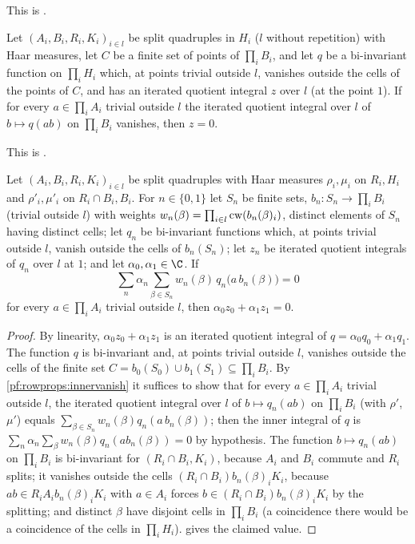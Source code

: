 This is .

\begin{lemma}\label{pf:rowprops:innervanish}
Let $(A_i,B_i,R_i,K_i)_{i\in l}$ be split quadruples in $H_i$ ($l$ without repetition) with Haar measures, let $C$ be a finite
set of points of $\prod_iB_i$, and let $q$ be a bi-invariant function on $\prod_iH_i$ which, at points trivial outside $l$,
vanishes outside the cells of the points of $C$, and has an iterated quotient integral $z$ over $l$ (at the point $1$).
If for every $a\in\prod_iA_i$ trivial outside $l$ the iterated quotient integral over $l$ of $b\mapsto q(ab)$ on
$\prod_iB_i$ vanishes, then $z=0$.
\end{lemma}

This is .

\begin{proposition}\label{pf:rowprops:cellvan}
Let $(A_i,B_i,R_i,K_i)_{i\in l}$ be split quadruples with Haar measures $\rho_i,\mu_i$ on $R_i,H_i$ and
$\rho'_i,\mu'_i$ on $R_i\cap B_i,B_i$. For $n\in\{0,1\}$ let $S_n$ be finite sets, $b_n:S_n\to\prod_iB_i$ (trivial outside $l$)
with weights $w_n(\beta)=\prod_{i\in l}\mathrm{cw}(b_n(\beta)_i)$, distinct elements of $S_n$ having distinct cells; let
$q_n$ be bi-invariant functions which, at points trivial outside $l$, vanish outside the cells of $b_n(S_n)$; let $z_n$ be
iterated quotient integrals of $q_n$ over $l$ at $1$; and let $\alpha_0,\alpha_1\in\C$. If
\[
\sum_n\alpha_n\sum_{\beta\in S_n}w_n(\beta)\,q_n\bigl(a\,b_n(\beta)\bigr)=0
\]
for every $a\in\prod_iA_i$ trivial outside $l$, then $\alpha_0z_0+\alpha_1z_1=0$.
\end{proposition}

\begin{proof}
By linearity, $\alpha_0z_0+\alpha_1z_1$ is an iterated quotient integral of $q=\alpha_0q_0+\alpha_1q_1$. The function $q$ is
bi-invariant and, at points trivial outside $l$, vanishes outside the cells of the finite set
$C=b_0(S_0)\cup b_1(S_1)\subseteq\prod_iB_i$. By \cref{pf:rowprops:innervanish} it suffices to show that for every
$a\in\prod_iA_i$ trivial outside $l$, the iterated quotient integral over $l$ of $b\mapsto q_n(ab)$ on $\prod_i B_i$ (with
$\rho'$, $\mu'$) equals $\sum_{\beta\in S_n}w_n(\beta)q_n(a\,b_n(\beta))$; then the inner integral of $q$ is
$\sum_n\alpha_n\sum_\beta w_n(\beta)q_n(ab_n(\beta))=0$ by hypothesis. The function $b\mapsto q_n(ab)$ on $\prod_iB_i$ is
bi-invariant for $(R_i\cap B_i,K_i)$, because $A_i$ and $B_i$ commute and $R_i$ splits; it vanishes outside the cells
$(R_i\cap B_i)b_n(\beta)_iK_i$, because $ab\in R_iA_ib_n(\beta)_iK_i$ with $a\in A_i$ forces $b\in(R_i\cap
B_i)b_n(\beta)_iK_i$ by the splitting; and distinct $\beta$ have disjoint cells in $\prod_iB_i$ (a coincidence there would be
a coincidence of the cells in $\prod_iH_i$).  gives the claimed value.
\end{proof}

